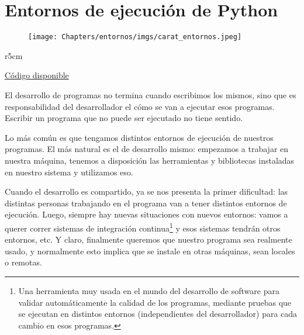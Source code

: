 

\chapter{Entornos de ejecución de Python} \label{ch:entornos}

\begin{figure}[!t]
    \vspace{-15mm} 
    \texttt{[image: Chapters/entornos/imgs/carat\_entornos.jpeg]}
\end{figure}

\begin{wraptable}{r}{5cm}
\begin{modulesinfo}
\begin{center}
{\small
\href{https://github.com/facundobatista/libro-pyciencia/tree/master/código/entornos/}{Código disponible}
}
\end{center}
\end{modulesinfo}
\end{wraptable}

El desarrollo de programas no termina cuando escribimos los mismos, sino que es responsabilidad del desarrollador el cómo se van a ejecutar esos programas. Escribir un programa que no puede ser ejecutado no tiene sentido.

Lo más común es que tengamos distintos entornos de ejecución de nuestros programas. El más natural es el de desarrollo mismo: empezamos a trabajar en nuestra máquina, tenemos a disposición las herramientas y bibliotecas instaladas en nuestro sistema y utilizamos eso.

Cuando el desarrollo es compartido, ya se nos presenta la primer dificultad: las distintas personas trabajando en el programa van a tener distintos entornos de ejecución. Luego, siempre hay nuevas situaciones con nuevos entornos: vamos a querer correr sistemas de integración continua\footnote{Una herramienta muy usada en el mundo del desarrollo de software para validar automáticamente la calidad de los programas, mediante pruebas que se ejecutan en distintos entornos (independientes del desarrollador) para cada cambio en esos programas.} y esos sistemas tendrán otros entornos, etc. Y claro, finalmente queremos que nuestro programa sea realmente usado, y normalmente esto implica que se instale en otras máquinas, sean locales o remotas.

